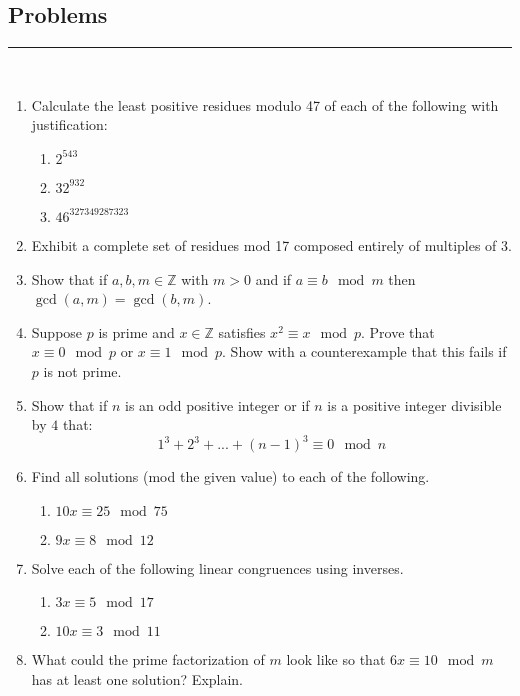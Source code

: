 \documentclass[class=article, crop=false]{standalone}
\def\integers{{\mathbb Z}}
\begin{document}
\subsection{Problems}
\rule{\textwidth}{1pt}\\
\begin{enumerate}
\item
  Calculate the least positive residues modulo 47 of each of
  the following with justification:
  \begin{enumerate}
  \item $2^{543}$
  \item $32^{932}$
  \item $46^{327349287323}$
  \end{enumerate}

\item
  Exhibit a complete set of residues mod 17 composed entirely of
  multiples of 3.

\item
  Show that if $a,b,m\in\integers$ with $m>0$ and if
  $a\equiv b\mod m$ then $\gcd(a,m)=\gcd(b,m)$.

\item
  Suppose $p$ is prime and $x\in\integers$ satisfies
  $x^2\equiv x\mod p$.  Prove that $x\equiv 0\mod p$ or $x\equiv 1\mod p$.
  Show with a counterexample that this fails if $p$ is not prime.

\item
  Show that if $n$ is an odd positive integer or if $n$ is a positive
  integer divisible by $4$ that:
  $$1^3+2^3+...+(n-1)^3\equiv 0\mod n$$

\item
  Find all solutions (mod the given value) to each of the following.
  \begin{enumerate}
  \item $10x \equiv 25\mod 75$
  \item $9x \equiv 8\mod 12$
  \end{enumerate}

\item
  Solve each of the following linear congruences using inverses.
  \begin{enumerate}
  \item $3x \equiv 5\mod 17$
  \item $10x \equiv 3\mod 11$
  \end{enumerate}

\item
  What could the prime factorization of $m$ look like so that
  $6x\equiv 10\mod m$ has at least one solution?  Explain.


\end{enumerate}
\end{document}
